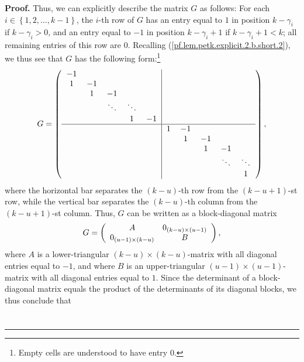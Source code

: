 \documentclass[numbers=enddot,12pt,final,onecolumn,notitlepage]{scrartcl}%
\theoremstyle{definition}
\newenvironment{proof}[1][Proof]{\noindent\textbf{#1.} }{\ \rule{0.5em}{0.5em}}
\newenvironment{vershort}{}{}
\begin{document}
\begin{proof}
\begin{vershort}
\noindent Thus, we can explicitly describe the matrix $G$ as follows: For each
$i\in\left\{  1,2,\ldots,k-1\right\}  $, the $i$-th row of $G$ has an entry
equal to $1$ in position $k-\gamma_{i}$ if $k-\gamma_{i}>0$, and an entry
equal to $-1$ in position $k-\gamma_{i}+1$ if $k-\gamma_{i}+1<k$; all
remaining entries of this row are $0$. Recalling
(\ref{pf.lem.petk.explicit.2.b.short.2}), we thus see that $G$ has the
following form:\footnote{Empty cells are understood to have entry $0$.}%
\[
G=\left(
\begin{tabular}
[c]{ccccc|ccccc}%
$-1$ &  &  &  &  &  &  &  &  & \\
$1$ & $-1$ &  &  &  &  &  &  &  & \\
& $1$ & $-1$ &  &  &  &  &  &  & \\
&  & $\ddots$ & $\ddots$ &  &  &  &  &  & \\
&  &  & $1$ & $-1$ &  &  &  &  & \\\hline
&  &  &  &  & $1$ & $-1$ &  &  & \\
&  &  &  &  &  & $1$ & $-1$ &  & \\
&  &  &  &  &  &  & $1$ & $-1$ & \\
&  &  &  &  &  &  &  & $\ddots$ & $\ddots$\\
&  &  &  &  &  &  &  &  & $1$%
\end{tabular}
\right)  ,
\]
where the horizontal bar separates the $\left(  k-u\right)  $-th row from the
$\left(  k-u+1\right)  $-st row, while the vertical bar separates the $\left(
k-u\right)  $-th column from the $\left(  k-u+1\right)  $-st column. Thus, $G$
can be written as a block-diagonal matrix
\begin{equation}
G=\left(
\begin{array}
[c]{cc}%
A & 0_{\left(  k-u\right)  \times\left(  u-1\right)  }\\
0_{\left(  u-1\right)  \times\left(  k-u\right)  } & B
\end{array}
\right)  , \label{pf.lem.petk.explicit.2.b.short.blocks}%
\end{equation}
where $A$ is a lower-triangular $\left(  k-u\right)  \times\left(  k-u\right)
$-matrix with all diagonal entries equal to $-1$, and where $B$ is an
upper-triangular $\left(  u-1\right)  \times\left(  u-1\right)  $-matrix with
all diagonal entries equal to $1$. Since the determinant of a block-diagonal
matrix equals the product of the determinants of its diagonal blocks, we thus
conclude that%
\begin{align}

\end{align}
\end{vershort}
\end{proof}
\end{document}
